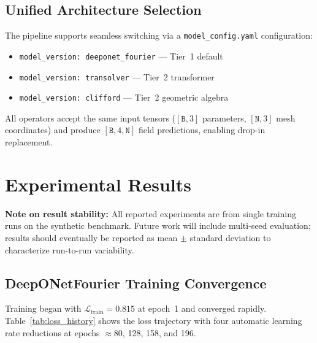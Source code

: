 \documentclass[conference]{IEEEtran}
\begin{document}
\subsection{Unified Architecture Selection}

The pipeline supports seamless switching via a \texttt{model\_config.yaml} configuration:
\begin{itemize}
    \item \texttt{model\_version: deeponet\_fourier} --- Tier~1 default
    \item \texttt{model\_version: transolver} --- Tier~2 transformer
    \item \texttt{model\_version: clifford} --- Tier~2 geometric algebra
\end{itemize}
All operators accept the same input tensors ($[\texttt{B},3]$ parameters, $[\texttt{N},3]$ mesh coordinates) and produce $[\texttt{B},4,\texttt{N}]$ field predictions, enabling drop-in replacement.

\section{Experimental Results}
\label{sec:results}

\textbf{Note on result stability:} All reported experiments are from single training runs on the synthetic benchmark. Future work will include multi-seed evaluation; results should eventually be reported as mean $\pm$ standard deviation to characterize run-to-run variability.

\subsection{DeepONetFourier Training Convergence}

Training began with $\mathcal{L}_\text{train} = 0.815$ at epoch~1 and converged rapidly. Table~\ref{tab:loss_history} shows the loss trajectory with four automatic learning rate reductions at epochs $\approx$80, 128, 158, and 196.
\end{document}
